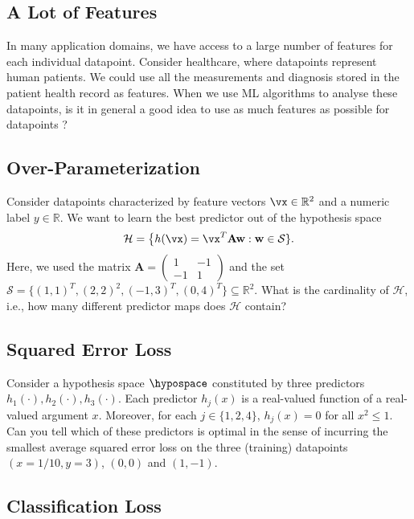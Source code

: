 \documentclass[12pt]{report}
\begin{document}
  \subsection{A Lot of Features}
 \label{ex_2_toomanyfeatures}
In many application domains, we have access to a large number of features for 
each individual datapoint. Consider healthcare, where datapoints represent 
human patients. We could use all the measurements and diagnosis stored in 
the patient health record as features. When we use ML algorithms to 
analyse these datapoints, is it in general a good idea to use as much 
features as possible for datapoints ? 
 
  \subsection{Over-Parameterization}
 \label{ex_2_overparm}
Consider datapoints characterized by feature vectors $\vx \in \mathbb{R}^{2}$ and 
a numeric label $y \in \mathbb{R}$. We want to learn the best 
predictor out of the hypothesis space 
$$ \mathcal{H} = \big\{ h(\vx) = \vx^{T} \mathbf{A} \mathbf{w}: \mathbf{w} \in \mathcal{S} \}. $$
Here, we used the matrix 
$\mathbf{A} = \begin{pmatrix} 1 & -1 \\ -1 & 1 \end{pmatrix}$ and 
the set $\mathcal{S} = \big\{ (1,1)^{T}, (2,2)^{2}, (-1,3)^{T}, (0,4)^{T} \big\} \subseteq \mathbb{R}^{2}$. 
What is the cardinality of $\mathcal{H}$, i.e., how many 
different predictor maps does $\mathcal{H}$ contain?
 
  \subsection{Squared Error Loss}
 \label{ex_2_4}
 Consider a hypothesis space $\hypospace$ constituted by three predictors $h_{1}(\cdot), h_{2}(\cdot),h_{3}(\cdot)$. 
 Each predictor $h_{j}(x)$ is a real-valued function of a real-valued argument $x$. Moreover, for each $j \in \{1,2,4\}$, 
 $h_{j}(x) = 0$ for all $x^2 \leq 1$. Can you tell which of these predictors is optimal in the sense of incurring the 
 smallest average squared error loss on the three (training) datapoints $(x=1/10,y=3)$, $(0,0)$ and $(1,-1)$. 
 
 \subsection{Classification Loss} 
 \label{ex_2_classif_loss}
 \begin{center}
 \end{center}
 
\end{document}
